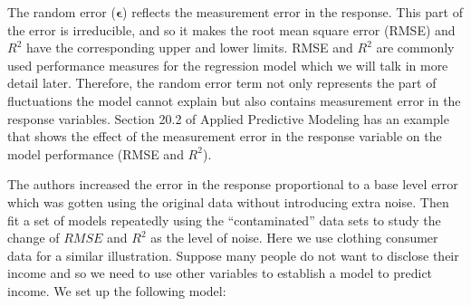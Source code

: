 \documentclass[12pt,]{krantz}
\newenvironment{Shaded}{\begin{snugshade}}{\end{snugshade}}
\newcommand{\KeywordTok}[1]{\textcolor[rgb]{0.13,0.29,0.53}{\textbf{{#1}}}}
\newcommand{\DataTypeTok}[1]{\textcolor[rgb]{0.13,0.29,0.53}{{#1}}}
\newcommand{\FloatTok}[1]{\textcolor[rgb]{0.00,0.00,0.81}{{#1}}}
\newcommand{\StringTok}[1]{\textcolor[rgb]{0.31,0.60,0.02}{{#1}}}
\newcommand{\CommentTok}[1]{\textcolor[rgb]{0.56,0.35,0.01}{\textit{{#1}}}}
\newcommand{\NormalTok}[1]{{#1}}
\theoremstyle{definition}
\theoremstyle{definition}
\theoremstyle{remark}
\begin{document}
The random error (\(\mathbf{\epsilon}\)) reflects the measurement error
in the response. This part of the error is irreducible, and so it makes
the root mean square error (RMSE) and \(R^2\) have the corresponding
upper and lower limits. RMSE and \(R^2\) are commonly used performance
measures for the regression model which we will talk in more detail
later. Therefore, the random error term not only represents the part of
fluctuations the model cannot explain but also contains measurement
error in the response variables. Section 20.2 of Applied Predictive
Modeling \citep{APM} has an example that shows the effect of the
measurement error in the response variable on the model performance
(RMSE and \(R^2\)).

The authors increased the error in the response proportional to a base
level error which was gotten using the original data without introducing
extra noise. Then fit a set of models repeatedly using the
``contaminated'' data sets to study the change of \(RMSE\) and \(R^2\)
as the level of noise. Here we use clothing consumer data for a similar
illustration. Suppose many people do not want to disclose their income
and so we need to use other variables to establish a model to predict
income. We set up the following model:

\begin{Shaded}
\end{Shaded}
\end{document}

